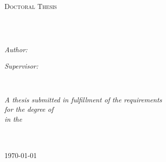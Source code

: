 \documentclass[
]{MastersDoctoralThesis} %
\author{John \textsc{Smith}} %
\begin{document}
\frontmatter %

\pagestyle{plain} %


\begin{titlepage}
\begin{center}

\vspace*{.06\textheight}
{\scshape\LARGE \univname\par}\vspace{1.5cm} %
\textsc{\Large Doctoral Thesis}\\[0.5cm] %

\HRule \\[0.4cm] %
{\huge \bfseries \ttitle\par}\vspace{0.4cm} %
\HRule \\[1.5cm] %
 
\begin{minipage}[t]{0.4\textwidth}
\begin{flushleft} \large
\emph{Author:}\\
\href{http://www.johnsmith.com}{\authorname} %
\end{flushleft}
\end{minipage}
\begin{minipage}[t]{0.4\textwidth}
\begin{flushright} \large
\emph{Supervisor:} \\
\href{http://www.jamessmith.com}{\supname} %
\end{flushright}
\end{minipage}\\[3cm]
 
\vfill

\large \textit{A thesis submitted in fulfillment of the requirements\\ for the degree of \degreename}\\[0.3cm] %
\textit{in the}\\[0.4cm]
\groupname\\\deptname\\[2cm] %
 
\vfill

{\large \today}\\[4cm] %
 
\vfill
\end{center}
\end{titlepage}
\end{document}
